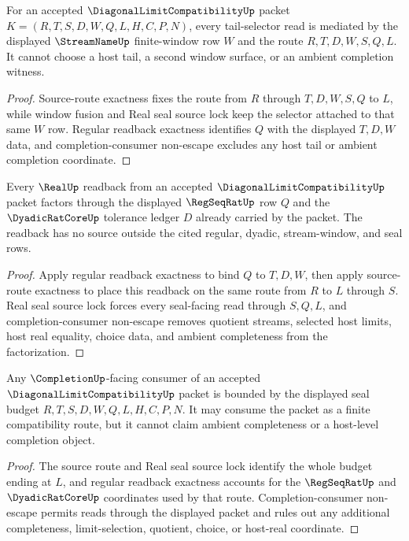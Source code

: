 \begin{theorem}\label{thm:diagonal-limit-compatibility-tail-selector-scope}
For an accepted $\DiagonalLimitCompatibilityUp$ packet $K=(R,T,S,D,W,Q,L,H,C,P,N)$, every tail-selector read is mediated by the displayed $\StreamNameUp$ finite-window row $W$ and the route $R,T,D,W,S,Q,L$. It cannot choose a host tail, a second window surface, or an ambient completion witness.
\end{theorem}
\begin{proof}
Source-route exactness fixes the route from $R$ through $T,D,W,S,Q$ to $L$, while window fusion and Real seal source lock keep the selector attached to that same $W$ row. Regular readback exactness identifies $Q$ with the displayed $T,D,W$ data, and completion-consumer non-escape excludes any host tail or ambient completion coordinate.
\end{proof}
\begin{theorem}\label{thm:diagonal-limit-compatibility-real-regseq-source-factorization}
Every $\RealUp$ readback from an accepted $\DiagonalLimitCompatibilityUp$ packet factors through the displayed $\RegSeqRatUp$ row $Q$ and the $\DyadicRatCoreUp$ tolerance ledger $D$ already carried by the packet. The readback has no source outside the cited regular, dyadic, stream-window, and seal rows.
\end{theorem}
\begin{proof}
Apply regular readback exactness to bind $Q$ to $T,D,W$, then apply source-route exactness to place this readback on the same route from $R$ to $L$ through $S$. Real seal source lock forces every seal-facing read through $S,Q,L$, and completion-consumer non-escape removes quotient streams, selected host limits, host real equality, choice data, and ambient completeness from the factorization.
\end{proof}
\begin{theorem}\label{thm:diagonal-limit-compatibility-completion-seal-budget}
Any $\CompletionUp$-facing consumer of an accepted $\DiagonalLimitCompatibilityUp$ packet is bounded by the displayed seal budget $R,T,S,D,W,Q,L,H,C,P,N$. It may consume the packet as a finite compatibility route, but it cannot claim ambient completeness or a host-level completion object.
\end{theorem}
\begin{proof}
The source route and Real seal source lock identify the whole budget ending at $L$, and regular readback exactness accounts for the $\RegSeqRatUp$ and $\DyadicRatCoreUp$ coordinates used by that route. Completion-consumer non-escape permits reads through the displayed packet and rules out any additional completeness, limit-selection, quotient, choice, or host-real coordinate.
\end{proof}

